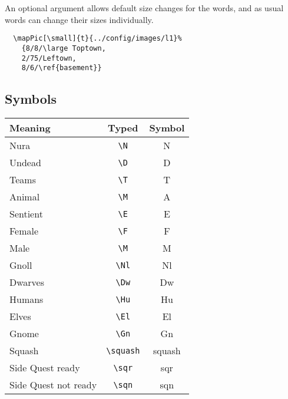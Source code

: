 \documentclass[a4paper,openany]{book}
\begin{document}
\begin{multicols}{2}
An optional argument allows default size changes for the words, and as usual words can change their sizes individually.

\begin{verbatim}
  \mapPic[\small]{t}{../config/images/l1}%
    {8/8/\large Toptown,
    2/75/Leftown,
    8/6/\ref{basement}}
\end{verbatim}

\subsection{Symbols}

\begin{tabularx}{\linewidth}{Xcc}

  Meaning & Typed & Symbol \\\hline

  Nura & {\tt \textbackslash{N}} & \gls{N} \\

  Undead & {\tt \textbackslash{D}} & \gls{D} \\
  \hline
  Teams & {\tt \textbackslash{T}} & \gls{T} \\

  Animal & {\tt \textbackslash{M}} & \gls{A} \\

  Sentient & {\tt \textbackslash{E}} & \gls{E} \\

  Female & {\tt \textbackslash{F}} & \gls{F} \\

  Male & {\tt \textbackslash{M}} & \gls{M} \\

  \hline
  Gnoll & {\tt \textbackslash{Nl}} & \gls{Nl} \\

  Dwarves & {\tt \textbackslash{Dw}} & \gls{Dw} \\

  Humans & {\tt \textbackslash{Hu}} & \gls{Hu} \\

  Elves & {\tt \textbackslash{El}} & \gls{El} \\

  Gnome & {\tt \textbackslash{Gn}} & \gls{Gn} \\
  \hline
  Squash & {\tt \textbackslash{squash}} & \gls{squash} \\

  Side Quest ready & {\tt \textbackslash{sqr}} & \gls{sqr} \\

  Side Quest not ready & {\tt \textbackslash{sqn}} & \gls{sqn} \\

\end{tabularx}

\end{multicols}
\end{document}
